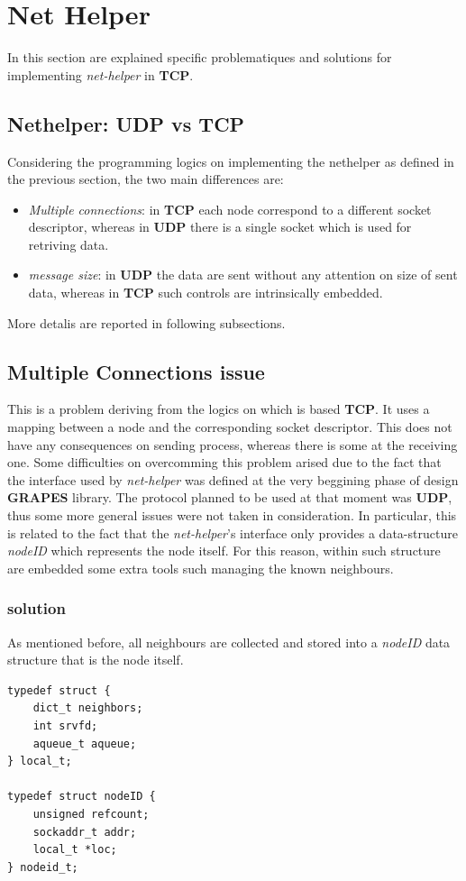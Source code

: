 \section{Net Helper}
In this section are explained specific problematiques and solutions for implementing \textit{net-helper} in
\textbf{TCP}.

\subsection{Nethelper: UDP vs TCP}
Considering the programming logics on implementing the nethelper as defined in the previous section, the two
main differences are:
\begin{itemize}
  \item \textit{Multiple connections}: in \textbf{TCP} each node correspond to a different socket descriptor,
    whereas in \textbf{UDP} there is a single socket which is used for retriving data.
  \item \textit{message size}: in \textbf{UDP} the data are sent without any attention on size of
    sent data, whereas in \textbf{TCP} such controls are intrinsically embedded. 
\end{itemize}
More detalis are reported in following subsections.

\subsection{Multiple Connections issue}
This is a problem deriving from the logics on which is based \textbf{TCP}. It uses a mapping between a node
and the corresponding socket descriptor. This does not have any consequences on sending process, whereas there
is some at the receiving one. Some difficulties on overcomming this problem arised due to the fact that the
interface used by \textit{net-helper} was defined at the very beggining phase of design \textbf{GRAPES}
library. The protocol planned to be used at that moment was \textbf{UDP}, thus some more general issues
were not taken in consideration. In particular, this is related to the fact that the \textit{net-helper}'s
interface only provides a data-structure \textit{nodeID} which represents the node itself. For this reason,
within such structure are embedded some extra tools such managing the known neighbours.

\subsubsection{solution}
As mentioned before, all neighbours are collected and stored into a \textit{nodeID} data structure that
is the node itself.
\begin{lstlisting}
typedef struct {
    dict_t neighbors;
    int srvfd;
    aqueue_t aqueue;
} local_t;

typedef struct nodeID {
    unsigned refcount;
    sockaddr_t addr;
    local_t *loc;
} nodeid_t;
\end{lstlisting}

